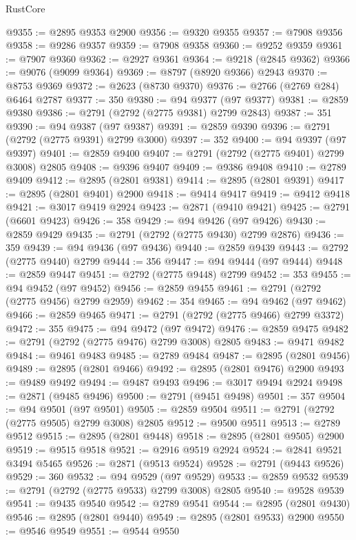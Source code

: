 \begin{lexlean}{RustCore}
\begin{coremodule}
@9355 := @2895 @9353 @2900
@9356 := @9320 @9355
@9357 := @7908 @9356
@9358 := @9286 @9357
@9359 := @7908 @9358
@9360 := @9252 @9359
@9361 := @7907 @9360
@9362 := @2927 @9361
@9364 := @9218 (@2845 @9362)
@9366 := @9076 (@9099 @9364)
@9369 := @8797 (@8920 @9366) @2943
@9370 := @8753 @9369
@9372 := @2623 (@8730 @9370)
@9376 := @2766 (@2769 @284) @6464 @2787
@9377 := 350
@9380 := @94 @9377 (@97 @9377)
@9381 := @2859 @9380
@9386 := @2791 (@2792 (@2775 @9381) @2799 @2843)
@9387 := 351
@9390 := @94 @9387 (@97 @9387)
@9391 := @2859 @9390
@9396 := @2791 (@2792 (@2775 @9391) @2799 @3000)
@9397 := 352
@9400 := @94 @9397 (@97 @9397)
@9401 := @2859 @9400
@9407 := @2791 (@2792 (@2775 @9401) @2799 @3008) @2805
@9408 := @9396 @9407
@9409 := @9386 @9408
@9410 := @2789 @9409
@9412 := @2895 (@2801 @9381)
@9414 := @2895 (@2801 @9391)
@9417 := @2895 (@2801 @9401) @2900
@9418 := @9414 @9417
@9419 := @9412 @9418
@9421 := @3017 @9419 @2924
@9423 := @2871 (@9410 @9421)
@9425 := @2791 (@6601 @9423)
@9426 := 358
@9429 := @94 @9426 (@97 @9426)
@9430 := @2859 @9429
@9435 := @2791 (@2792 (@2775 @9430) @2799 @2876)
@9436 := 359
@9439 := @94 @9436 (@97 @9436)
@9440 := @2859 @9439
@9443 := @2792 (@2775 @9440) @2799
@9444 := 356
@9447 := @94 @9444 (@97 @9444)
@9448 := @2859 @9447
@9451 := @2792 (@2775 @9448) @2799
@9452 := 353
@9455 := @94 @9452 (@97 @9452)
@9456 := @2859 @9455
@9461 := @2791 (@2792 (@2775 @9456) @2799 @2959)
@9462 := 354
@9465 := @94 @9462 (@97 @9462)
@9466 := @2859 @9465
@9471 := @2791 (@2792 (@2775 @9466) @2799 @3372)
@9472 := 355
@9475 := @94 @9472 (@97 @9472)
@9476 := @2859 @9475
@9482 := @2791 (@2792 (@2775 @9476) @2799 @3008) @2805
@9483 := @9471 @9482
@9484 := @9461 @9483
@9485 := @2789 @9484
@9487 := @2895 (@2801 @9456)
@9489 := @2895 (@2801 @9466)
@9492 := @2895 (@2801 @9476) @2900
@9493 := @9489 @9492
@9494 := @9487 @9493
@9496 := @3017 @9494 @2924
@9498 := @2871 (@9485 @9496)
@9500 := @2791 (@9451 @9498)
@9501 := 357
@9504 := @94 @9501 (@97 @9501)
@9505 := @2859 @9504
@9511 := @2791 (@2792 (@2775 @9505) @2799 @3008) @2805
@9512 := @9500 @9511
@9513 := @2789 @9512
@9515 := @2895 (@2801 @9448)
@9518 := @2895 (@2801 @9505) @2900
@9519 := @9515 @9518
@9521 := @2916 @9519 @2924
@9524 := @2841 @9521 @3494 @5465
@9526 := @2871 (@9513 @9524)
@9528 := @2791 (@9443 @9526)
@9529 := 360
@9532 := @94 @9529 (@97 @9529)
@9533 := @2859 @9532
@9539 := @2791 (@2792 (@2775 @9533) @2799 @3008) @2805
@9540 := @9528 @9539
@9541 := @9435 @9540
@9542 := @2789 @9541
@9544 := @2895 (@2801 @9430)
@9546 := @2895 (@2801 @9440)
@9549 := @2895 (@2801 @9533) @2900
@9550 := @9546 @9549
@9551 := @9544 @9550

\end{coremodule}
\end{lexlean}
